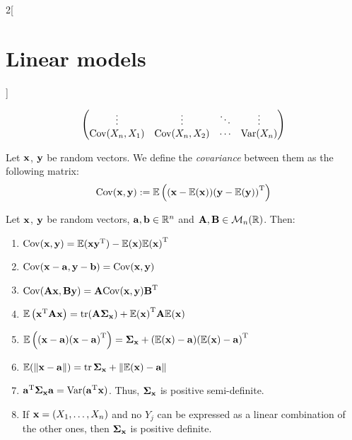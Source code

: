 \documentclass[../../../main_math.tex]{subfiles}
\begin{document}
\begin{multicols}{2}[\section{Linear models}]
\begin{proposition}
$$\begin{pmatrix}
        \vdots        & \vdots        & \ddots & \vdots        \\
        \cov(X_n,X_1) & \cov(X_n,X_2) & \cdots & \Var(X_n)     \\
      \end{pmatrix}$$
  \end{proposition}
  \begin{definition}
    Let $\vf{x}$, $\vf{y}$ be random vectors. We define the \emph{covariance} between them as the following matrix:
    $$\cov(\vf{x},\vf{y}):=\Exp\left((\vf{x}-\Exp(\vf{x}))\transpose{(\vf{y}-\Exp(\vf{y}))}\right)$$
  \end{definition}
  \begin{proposition}
    Let $\vf{x}$, $\vf{y}$ be random vectors, $\vf{a},\vf{b}\in\RR^n$ and $\vf{A},\vf{B}\in\mathcal{M}_n(\RR)$. Then:
    \begin{enumerate}
      \item $\cov(\vf{x},\vf{y})=\Exp(\vf{x}\transpose{\vf{y}})-\Exp(\vf{x})\transpose{\Exp(\vf{x})}$
      \item $\cov(\vf{x}-\vf{a},\vf{y}-\vf{b})=\cov(\vf{x},\vf{y})$
      \item $\cov(\vf{Ax},\vf{By})=\vf{A}\cov(\vf{x},\vf{y})\transpose{\vf{B}}$
      \item $\Exp\left(\transpose{\vf{x}}\vf{Ax}\right)=\trace(\vf{A\Sigma_{\vf{x}}}) + \transpose{\Exp(\vf{x})}\vf{A}\Exp(\vf{x})$
      \item $\Exp\left((\vf{x}-\vf{a})\transpose{(\vf{x}-\vf{a})}\right)=\vf\Sigma_{\vf{x}}+(\Exp(\vf{x})-\vf{a})\transpose{(\Exp(\vf{x})-\vf{a})}$
      \item $\Exp(\norm{\vf{x}-\vf{a}})=\trace\vf\Sigma_{\vf{x}}+\norm{\Exp(\vf{x})-\vf{a}}$
      \item $\transpose{\vf{a}}\vf\Sigma_{\vf{x}}\vf{a}=\Var(\transpose{\vf{a}}\vf{x})$. Thus, $\vf\Sigma_{\vf{x}}$ is positive semi-definite.
      \item If $\vf{x}=(X_1,\ldots,X_n)$ and no $Y_j$ can be expressed as a linear combination of the other ones, then $\vf\Sigma_{\vf{x}}$ is positive definite.
    \end{enumerate}
  \end{proposition}

\end{multicols}
\end{document}
